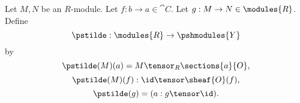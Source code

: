 \begin{definition}
Let $M,N$ be an $R$-module.
Let $f:b \rightarrow a \in \cat{C}$.
Let $g:M \rightarrow N \in \modules{R}$.
Define 
\[\pstilde: \modules{R} \rightarrow \pshmodules{Y}\]
by
\[\pstilde(M)(a) = M \tensor_R \sections{a}{O} ,\]
\[\pstilde(M)(f): \id \tensor \sheaf{O}(f) ,\]
\[\pstilde(g) = (a: g \tensor \id ).\]
\end{definition}
